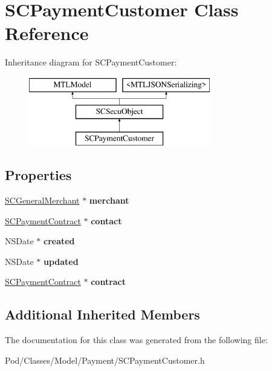 \hypertarget{interface_s_c_payment_customer}{}\section{S\+C\+Payment\+Customer Class Reference}
\label{interface_s_c_payment_customer}
Inheritance diagram for S\+C\+Payment\+Customer\+:\begin{figure}[H]
\begin{center}
\leavevmode
\includegraphics[height=3.000000cm]{interface_s_c_payment_customer}
\end{center}
\end{figure}
\subsection*{Properties}
\begin{DoxyCompactItemize}
\item 
\hyperlink{interface_s_c_general_merchant}{S\+C\+General\+Merchant} $\ast$ {\bfseries merchant}\hypertarget{interface_s_c_payment_customer_ac740972dfde00bba63e1596c9b1505ba}{}\label{interface_s_c_payment_customer_ac740972dfde00bba63e1596c9b1505ba}

\item 
\hyperlink{interface_s_c_payment_contract}{S\+C\+Payment\+Contract} $\ast$ {\bfseries contact}\hypertarget{interface_s_c_payment_customer_a163aa2d74ed31ffe708b2d6400101747}{}\label{interface_s_c_payment_customer_a163aa2d74ed31ffe708b2d6400101747}

\item 
N\+S\+Date $\ast$ {\bfseries created}\hypertarget{interface_s_c_payment_customer_ac1491b7683040069dd8539cd2be282ad}{}\label{interface_s_c_payment_customer_ac1491b7683040069dd8539cd2be282ad}

\item 
N\+S\+Date $\ast$ {\bfseries updated}\hypertarget{interface_s_c_payment_customer_aaca771f310a74e08e7448033dd934c1a}{}\label{interface_s_c_payment_customer_aaca771f310a74e08e7448033dd934c1a}

\item 
\hyperlink{interface_s_c_payment_contract}{S\+C\+Payment\+Contract} $\ast$ {\bfseries contract}\hypertarget{interface_s_c_payment_customer_a9defd6e26a741f87d11b901bd60d83a5}{}\label{interface_s_c_payment_customer_a9defd6e26a741f87d11b901bd60d83a5}

\end{DoxyCompactItemize}
\subsection*{Additional Inherited Members}


The documentation for this class was generated from the following file\+:\begin{DoxyCompactItemize}
\item 
Pod/\+Classes/\+Model/\+Payment/S\+C\+Payment\+Customer.\+h\end{DoxyCompactItemize}
